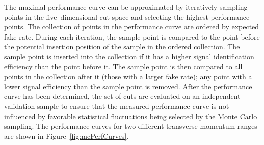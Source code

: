 The maximal performance curve can be approximated by iteratively sampling points
in the five--dimensional cut space and selecting the highest performance points.
The collection of points in the performance curve are ordered by expected fake
rate.  During each iteration, the sample point is compared to the point before
the potential insertion position of the sample in the ordered collection.  The
sample point is inserted into the collection if it has a higher signal
identification efficiency than the point before it.  The sample point is then
compared to all points in the collection after it (\ie those with a larger fake
rate); any point with a lower signal efficiency than the sample point is
removed.  After the performance curve has been determined, the set of cuts are
evaluated on an independent validation sample to ensure that the measured
performance curve is not influenced by favorable statistical fluctuations being
selected by the Monte Carlo sampling.  The performance curves for two different
transverse momentum ranges are shown in Figure~\ref{fig:mcPerfCurves}.
%
